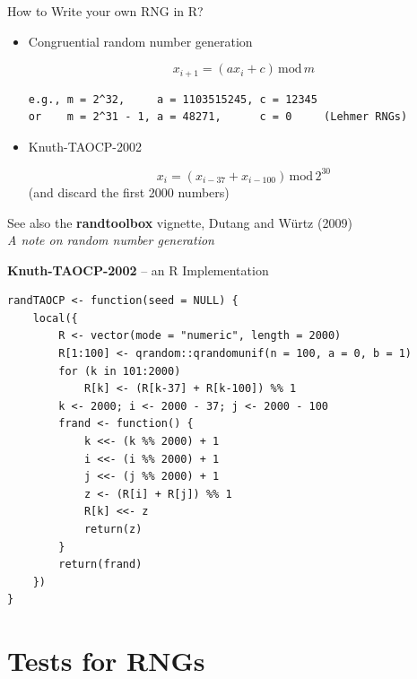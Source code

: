 \documentclass[ignorenonframetext,]{beamer}
\begin{document}
\begin{frame}[fragile]{How to Write your own RNG in R?}
\protect\hypertarget{how-to-write-your-own-rng-in-r}{}

\begin{itemize}
\item
  Congruential random number generation

  \[x_{i+1} = (a x_i + c)\,\mathrm{mod}\,m\]

\begin{verbatim}
e.g., m = 2^32,     a = 1103515245, c = 12345
or    m = 2^31 - 1, a = 48271,      c = 0     (Lehmer RNGs)
\end{verbatim}
\item
  Knuth-TAOCP-2002

  \[x_i = (x_{i-37} + x_{i-100})\,\mathrm{mod}\,2^{30}\] (and discard
  the first 2000 numbers)
\end{itemize}

See also the \textbf{randtoolbox} vignette, Dutang and Würtz (2009)\\
\emph{A note on random number generation}

\end{frame}

\begin{frame}[fragile]

\textbf{Knuth-TAOCP-2002} -- an R Implementation

\begin{verbatim}
randTAOCP <- function(seed = NULL) {
    local({
        R <- vector(mode = "numeric", length = 2000)
        R[1:100] <- qrandom::qrandomunif(n = 100, a = 0, b = 1)
        for (k in 101:2000)
            R[k] <- (R[k-37] + R[k-100]) %% 1
        k <- 2000; i <- 2000 - 37; j <- 2000 - 100
        frand <- function() {
            k <<- (k %% 2000) + 1
            i <<- (i %% 2000) + 1
            j <<- (j %% 2000) + 1
            z <- (R[i] + R[j]) %% 1
            R[k] <<- z
            return(z)
        }
        return(frand)
    })
}
\end{verbatim}

\end{frame}

\hypertarget{tests-for-rngs}{%
\section{Tests for RNGs}\label{tests-for-rngs}}
\end{document}
